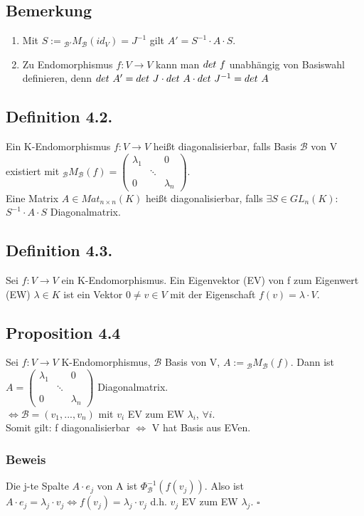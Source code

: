 \documentclass[a4paper, 12pt]{extarticle}
\newcommand{\threeXthree}[9] {
	\left( 
	\begin{matrix}
		#1 & #2 & #3\\
		#4 & #5 & #6\\
		#7 & #8 & #9
	\end{matrix}
	\right)
}
\newcommand{\tn}[1]{\textnormal {#1}}
\begin{document}
\subsection*{Bemerkung}
\begin{enumerate}[label=(\alph*)]
	\item Mit $S:= {_{\mathcal B'}}M_\mathcal B(id_V) = J^{-1}$ gilt $A'=S^{-1}\cdot A \cdot S$.
	\item Zu Endomorphismus $f:V\to V$ kann man $det\tn{ } f$ unabhängig von Basiswahl definieren, 
	denn $det\tn{ } A' =det\tn{ } J\cdot det\tn{ } A\cdot det\tn{ } J^{-1} = det\tn{ } A$
\end{enumerate}
\subsection*{Definition 4.2.}
Ein K-Endomorphismus $f:V\to V$ heißt diagonalisierbar, falls Basis $\mathcal B$ von V existiert mit ${_\mathcal B}M_\mathcal B(f) = \threeXthree{\lambda_1}{ }{0}
								{ }{\ddots}{ }
								{0}{ }{\lambda_n}$. \\
Eine Matrix $A \in Mat_{n\times n}(K)$ heißt diagonalisierbar, falls $\exists S \in GL_n(K)$: $S^{-1}\cdot A \cdot S$ Diagonalmatrix.
\subsection*{Definition 4.3.}
Sei $f:V\to V$ ein K-Endomorphismus. Ein Eigenvektor (EV) von f zum Eigenwert (EW) $\lambda \in K$ ist ein Vektor $0 \neq v \in V$ mit der Eigenschaft $f(v) = \lambda\cdot V$.
\subsection*{Proposition 4.4}
Sei $f:V \to V$ K-Endomorphismus, $\mathcal B$ Basis von V, $A:= {_\mathcal B}M_\mathcal B(f)$. 
Dann ist $A=\threeXthree	{\lambda_1}{ }{0}
							{ }{\ddots}{ }
							{0}{ }{\lambda_n}$ Diagonalmatrix. \\
$\Leftrightarrow \mathcal B = (v_1,..., v_n)$ mit $v_i$ EV zum EW $\lambda_i$, $ \forall i$. \\
Somit gilt: f diagonalisierbar $\Leftrightarrow$ V hat Basis aus EVen.
\subsubsection*{Beweis}
Die j-te Spalte $A\cdot e_j$ von A ist $\Phi_{\mathcal B}^{-1}(f(v_j))$. Also ist $A\cdot e_j = \lambda_j\cdot v_j \Leftrightarrow f(v_j) = \lambda_j\cdot v_j$ d.h. $v_j$ EV zum EW $\lambda_j$. $\square$
\end{document}
